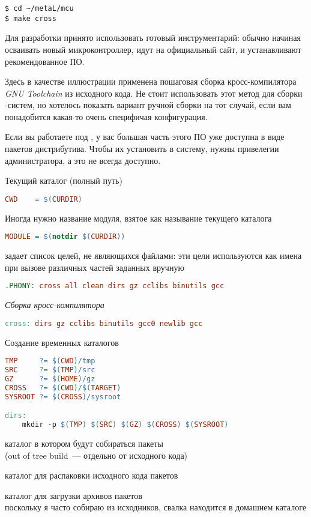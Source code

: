 \clearpage
{}\label{cross}

\begin{verbatim}
$ cd ~/metaL/mcu
$ make cross
\end{verbatim}

Для разработки принято использовать готовый инструментарий: обычно начиная
осваивать новый микроконтроллер, идут на официальный сайт, и устанавливают
рекомендованное ПО.

Здесь в качестве иллюстрации применена пошаговая сборка кросс-компилятора
\emph{GNU Toolchain} из исходного кода. Не стоит использовать этот метод для
сборки \linux-систем, но хотелось показать вариант ручной сборки на тот случай,
если вам понадобится какая-то очень специфичая конфигурация.

Если вы работаете под \linux, у вас большая часть этого ПО уже доступна в виде
пакетов дистрибутива. Чтобы их установить в систему, нужны привелегии
администратора, а это не всегда доступно. 

\clearpage\noindent
Текущий каталог (полный путь)
\begin{lstlisting}[language=make]
CWD    = $(CURDIR)
\end{lstlisting}
Иногда нужно название модуля, взятое как называние текущего каталога
\begin{lstlisting}[language=make]
MODULE = $(notdir $(CURDIR))
\end{lstlisting}
 задает список целей, не являющихся файлами: эти цели используются
как имена при вызове различных частей  заданных вручную
\begin{lstlisting}[language=make]
.PHONY: cross all clean dirs gz cclibs binutils gcc
\end{lstlisting}
\emph{Сборка кросс-компилятора}
\begin{lstlisting}[language=make]
cross: dirs gz cclibs binutils gcc0 newlib gcc
\end{lstlisting}
Создание временных каталогов
\begin{lstlisting}[language=make]
TMP		?= $(CWD)/tmp
SRC		?= $(TMP)/src
GZ		?= $(HOME)/gz
CROSS	?= $(CWD)/$(TARGET)
SYSROOT	?= $(CROSS)/sysroot

dirs:
	mkdir -p $(TMP) $(SRC) $(GZ) $(CROSS) $(SYSROOT)
\end{lstlisting}
\begin{description}[nosep]
\item[\file{TMP}] каталог в котором будут собираться пакеты\\(out of
tree build\ --- отдельно от исходного кода)
\item[\file{SRC}] каталог для распаковки исходного кода пакетов
\item[\file{GZ}] каталог для загрузки архивов пакетов\\
поскольку я часто собираю из исходников, свалка находится в домашнем каталоге 
\end{description}

